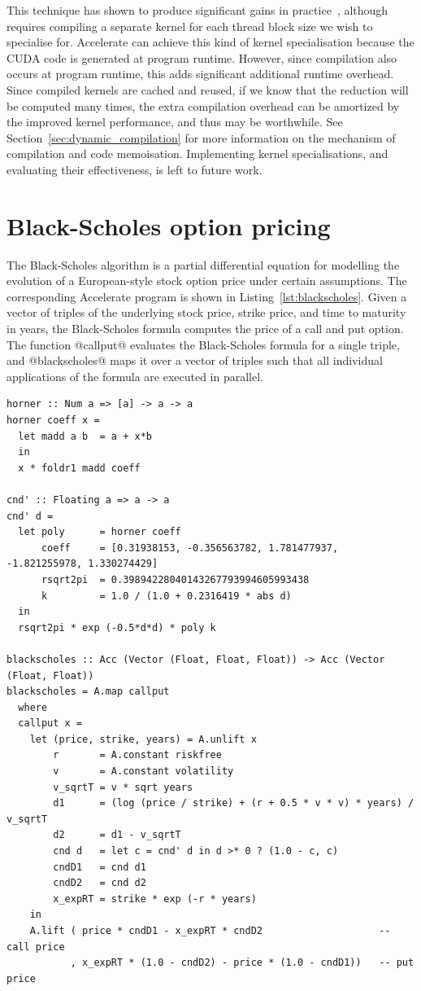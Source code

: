 This technique has shown to produce significant gains in
practice~\cite{Harris:2007te}, although requires compiling a separate kernel for
each thread block size we wish to specialise for. Accelerate can achieve this
kind of kernel specialisation because the CUDA code is generated at program
runtime. However, since compilation also occurs at program runtime, this adds
significant additional runtime overhead. Since compiled kernels are cached and
reused, if we know that the reduction will be computed many times, the extra
compilation overhead can be amortized by the improved kernel performance, and
thus may be worthwhile. See Section~\ref{sec:dynamic_compilation} for more
information on the mechanism of compilation and code memoisation. Implementing
kernel specialisations, and evaluating their effectiveness, is left to future
work.


\section{Black-Scholes option pricing}
\label{sec:blackscholes}

The Black-Scholes algorithm is a partial differential equation for modelling the
evolution of a European-style stock option price under certain assumptions. The
corresponding Accelerate program is shown in Listing~\ref{lst:blackscholes}.
Given a vector of triples of the underlying stock price, strike price, and time
to maturity in years, the Black-Scholes formula computes the price of a call and
put option. The function @callput@ evaluates the Black-Scholes formula for
a single triple, and @blackscholes@ maps it over a vector of triples such
that all individual applications of the formula are executed in parallel.

\begin{lstlisting}[style=haskell_float
    ,float
    ,label=lst:blackscholes
    ,caption={Black-Scholes option pricing}]
horner :: Num a => [a] -> a -> a
horner coeff x =
  let madd a b  = a + x*b
  in
  x * foldr1 madd coeff

cnd' :: Floating a => a -> a
cnd' d =
  let poly      = horner coeff
      coeff     = [0.31938153, -0.356563782, 1.781477937, -1.821255978, 1.330274429]
      rsqrt2pi  = 0.39894228040143267793994605993438
      k         = 1.0 / (1.0 + 0.2316419 * abs d)
  in
  rsqrt2pi * exp (-0.5*d*d) * poly k

blackscholes :: Acc (Vector (Float, Float, Float)) -> Acc (Vector (Float, Float))
blackscholes = A.map callput
  where
  callput x =
    let (price, strike, years) = A.unlift x
        r       = A.constant riskfree
        v       = A.constant volatility
        v_sqrtT = v * sqrt years
        d1      = (log (price / strike) + (r + 0.5 * v * v) * years) / v_sqrtT
        d2      = d1 - v_sqrtT
        cnd d   = let c = cnd' d in d >* 0 ? (1.0 - c, c)
        cndD1   = cnd d1
        cndD2   = cnd d2
        x_expRT = strike * exp (-r * years)
    in
    A.lift ( price * cndD1 - x_expRT * cndD2                    -- call price
           , x_expRT * (1.0 - cndD2) - price * (1.0 - cndD1))   -- put price
\end{lstlisting}

